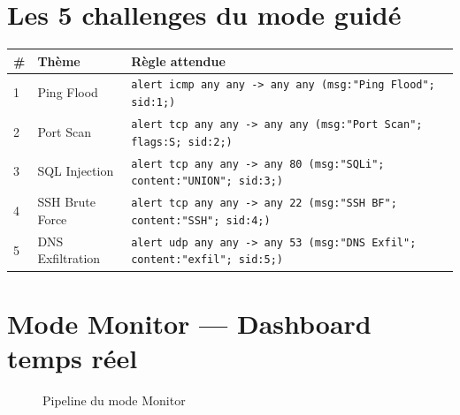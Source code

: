 \documentclass[12pt,a4paper]{report}
\newcommand{\code}[1]{\texttt{#1}}
\begin{document}
\section{Les 5 challenges du mode guidé}

\begin{center}
\begin{tabular}{C{0.5cm} L{3.5cm} L{8.5cm}}
  \toprule
  \textbf{\#} & \textbf{Thème} & \textbf{Règle attendue} \\
   & Ping Flood
    & \code{alert icmp any any -> any any (msg:"Ping Flood"; sid:1;)} \\[4pt]
  2 & Port Scan
    & \code{alert tcp any any -> any any (msg:"Port Scan"; flags:S; sid:2;)} \\[4pt]
  3 & SQL Injection
    & \code{alert tcp any any -> any 80 (msg:"SQLi"; content:"UNION"; sid:3;)} \\[4pt]
  4 & SSH Brute Force
    & \code{alert tcp any any -> any 22 (msg:"SSH BF"; content:"SSH"; sid:4;)} \\[4pt]
  5 & DNS Exfiltration
    & \code{alert udp any any -> any 53 (msg:"DNS Exfil"; content:"exfil"; sid:5;)} \\
  \bottomrule
\end{tabular}
\end{center}

\section{Mode Monitor — Dashboard temps réel}

\begin{figure}[h]
\centering
{}
\caption{Pipeline du mode Monitor}
\end{figure}
\end{document}
